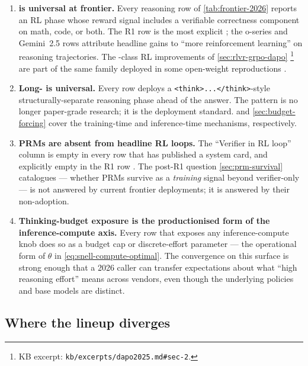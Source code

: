 \begin{enumerate}
\item \textbf{ is universal at frontier.} Every reasoning row of
\cref{tab:frontier-2026} reports an RL phase whose reward signal
includes a verifiable correctness component on math, code, or both.
The R1 row is the most explicit \citep[\S 2.2]{deepseek-r1}; the
o-series and Gemini~2.5 rows attribute headline gains to ``more
reinforcement learning''  on
reasoning trajectories. The -class RL improvements
of \cref{sec:rlvr-grpo-dapo} \citep{dapo2025}\footnote{KB excerpt:
\nolinkurl{kb/excerpts/dapo2025.md#sec-2}.} are part of the same family
deployed in some open-weight reproductions \citep{tulu3}.

\item \textbf{Long- is universal.} Every row deploys a
\texttt{<think>...</think>}-style structurally-separate reasoning
phase ahead of the answer. The pattern is no longer paper-grade
research; it is the deployment standard.  and
\cref{sec:budget-forcing} cover the training-time and inference-time
mechanisms, respectively.

\item \textbf{PRMs are absent from headline RL loops.} The
``Verifier in RL loop'' column is empty in every row that has
published a system card, and explicitly empty in the R1 row
\citep[\S 2.2]{deepseek-r1}. The post-R1 question
\cref{sec:prm-survival} catalogues --- whether PRMs survive as a
\emph{training} signal beyond verifier-only  --- is not answered
by current frontier deployments; it is answered by their non-adoption.

\item \textbf{Thinking-budget exposure is the productionised form of
the inference-compute axis.} Every row that exposes any
inference-compute knob does so as a budget cap or discrete-effort
parameter --- the operational form of $\theta$ in
\cref{eq:snell-compute-optimal}. The convergence on this surface is
strong enough that a 2026 caller can transfer expectations about
what ``high reasoning effort'' means across vendors, even though the
underlying policies and base models are distinct.
\end{enumerate}

\subsection{Where the lineup diverges}
\label{sec:frontier-diverge}

